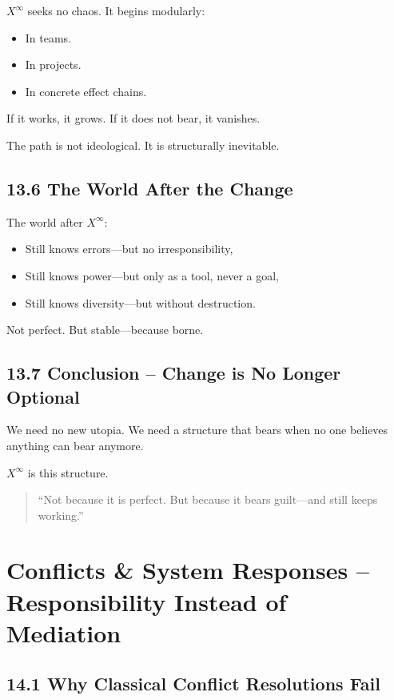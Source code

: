 \documentclass[12pt,a4paper]{book}
\begin{document}
$X^\infty$ seeks no chaos.  
It begins modularly:

\begin{itemize}
    \item In teams.
    \item In projects.
    \item In concrete effect chains.
\end{itemize}

If it works, it grows.  
If it does not bear, it vanishes.

The path is not ideological.  
It is structurally inevitable.

\section*{13.6 The World After the Change}

The world after $X^\infty$:

\begin{itemize}
    \item Still knows errors—but no irresponsibility,
    \item Still knows power—but only as a tool, never a goal,
    \item Still knows diversity—but without destruction.
\end{itemize}

Not perfect.  
But stable—because borne.

\section*{13.7 Conclusion – Change is No Longer Optional}

We need no new utopia.  
We need a structure that bears  
when no one believes anything can bear anymore.

$X^\infty$ is this structure.

\begin{quote}
“Not because it is perfect.  
But because it bears guilt—and still keeps working.”  
\end{quote}

\chapter{Conflicts \& System Responses – Responsibility Instead of Mediation}

\section*{14.1 Why Classical Conflict Resolutions Fail}
\end{document}
